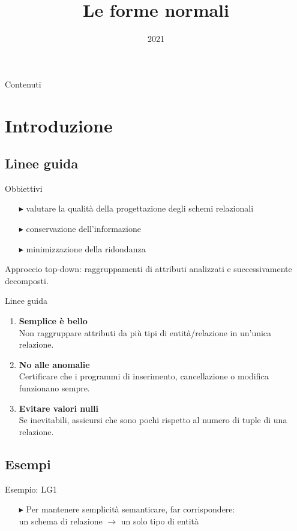 \documentclass{beamer}
\title{Le forme normali}
\institute{Università di Pisa}
\date{2021}
\begin{document}
\frame{\titlepage}
\begin{frame}{Contenuti}
    \tableofcontents
\end{frame}


\section{Introduzione}

\subsection{Linee guida}
\begin{frame}{Obbiettivi}
    
    \begin{itemize}
        \item[$\blacktriangleright$] valutare la qualità della progettazione degli schemi relazionali 
        \item[$\blacktriangleright$]  conservazione dell’informazione
        \item[$\blacktriangleright$]  minimizzazione della ridondanza
    \end{itemize}
    \vfill
    Approccio top-down: raggruppamenti di attributi analizzati e successivamente decomposti.
    
\end{frame}

\begin{frame}{Linee guida}

    \begin{enumerate}
        \item \textbf{Semplice è bello} \\ Non raggruppare attributi da più tipi di entità/relazione in un’unica relazione. 
        \item \textbf{No alle anomalie} \\  Certificare che i programmi di inserimento, cancellazione o modifica funzionano sempre.
        \item \textbf{Evitare valori nulli} \\  Se inevitabili, assicursi che sono pochi rispetto al numero di tuple di una relazione.
    \end{enumerate}
    
\end{frame}


\subsection{Esempi}
\begin{frame}{Esempio: LG1}

    \begin{itemize}
    
        \item[$\blacktriangleright$] Per mantenere semplicità semanticare, far corrispondere:\\
        un schema di relazione $\rightarrow$ un solo tipo di entità
    \end{itemize}


\end{frame}
\end{document}

